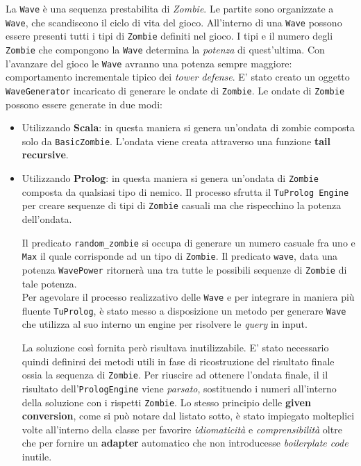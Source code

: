 La \texttt{Wave} è una sequenza prestabilita di \textit{Zombie}. Le partite sono organizzate a \texttt{Wave}, che scandiscono il ciclo di vita del gioco. All'interno di una \texttt{Wave} possono essere presenti tutti i tipi di \texttt{Zombie} definiti nel gioco. I tipi e il numero degli \texttt{Zombie} che compongono la \texttt{Wave} determina la \textit{potenza} di quest'ultima. Con l'avanzare del gioco le \texttt{Wave} avranno una potenza sempre maggiore: comportamento incrementale tipico dei \textit{tower defense}. E' stato creato un oggetto \texttt{WaveGenerator} incaricato di generare le ondate di \texttt{Zombie}. Le ondate di \texttt{Zombie} possono essere generate in due modi:
\begin{itemize}
    \item Utilizzando \textbf{Scala}: in questa maniera si genera un'ondata di zombie composta solo da \texttt{BasicZombie}. L'ondata viene creata attraverso una funzione \textbf{tail recursive}.
    
    \item Utilizzando \textbf{Prolog}: in questa maniera si genera un'ondata di \texttt{Zombie} composta da qualsiasi tipo di nemico. Il processo sfrutta il \texttt{TuProlog Engine} per creare sequenze di tipi di \texttt{Zombie} casuali ma che rispecchino la potenza dell'ondata. 
    
    Il predicato \texttt{random\_zombie} si occupa di generare un numero casuale fra uno e \texttt{Max} il quale corrisponde ad un tipo di \texttt{Zombie}. Il predicato \texttt{wave}, data una potenza \texttt{WavePower} ritornerà una tra tutte le possibili sequenze di \texttt{Zombie} di tale potenza.\\
    
    Per agevolare il processo realizzativo delle \texttt{Wave} e per integrare in maniera più fluente \texttt{TuProlog}, è stato messo a disposizione un metodo per generare \texttt{Wave} che utilizza al suo interno un engine per risolvere le \textit{query} in input.

    
    
    La soluzione così fornita però risultava inutilizzabile. E' stato necessario quindi definirsi dei metodi utili in fase di ricostruzione del risultato finale ossia la sequenza di \texttt{Zombie}. Per riuscire ad ottenere l'ondata finale, il il risultato dell'\texttt{PrologEngine} viene \textit{parsato}, sostituendo i numeri all'interno della soluzione con i rispetti \texttt{Zombie}. Lo stesso principio delle \textbf{given conversion}, come si può notare dal listato sotto, è stato impiegato molteplici volte all'interno della classe per favorire \textit{idiomaticità} e \textit{comprensibilità} oltre che per fornire un \textbf{adapter} automatico che non introducesse \textit{boilerplate code} inutile.

    
    
\end{itemize}